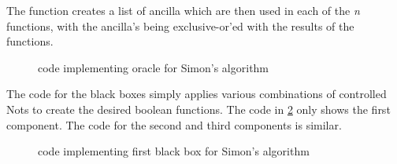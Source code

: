 The  function creates a list of ancilla \qubits{}
which are then used in each of the \emph{n} functions, with
the ancilla's being exclusive-or'ed with the results of the functions.


\begin{figure}[htbp]

\caption{\lqpl{} code implementing oracle for Simon's algorithm}\label{fig:simonsoracle}
\end{figure}

The code for the black boxes simply applies various combinations 
of controlled Nots to create the desired boolean functions. The 
code in \ref{fig:simonsblackboxes} only shows the first component. The
code for the second and third components is similar.

\begin{figure}[htbp]

\caption{\lqpl{} code implementing first black box for Simon's algorithm}\label{fig:simonsblackboxes}
\end{figure}
